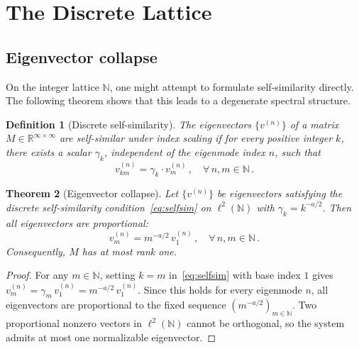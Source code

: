 \documentclass[12pt]{article}
\newtheorem{theorem}{Theorem}
\newtheorem{definition}[theorem]{Definition}
\begin{document}
\section{The Discrete Lattice}\label{sec:discrete}

\subsection{Eigenvector collapse}

On the integer lattice $\mathbb{N}$, one might attempt to formulate self-similarity directly. The following theorem shows that this leads to a degenerate spectral structure.

\begin{definition}[Discrete self-similarity]\label{def:discretess}
The eigenvectors $\{v^{(n)}\}$ of a matrix $M \in \mathbb{R}^{\infty \times \infty}$ are \emph{self-similar under index scaling} if for every positive integer $k$, there exists a scalar $\gamma_k$, independent of the eigenmode index $n$, such that
\begin{equation}\label{eq:selfsim}
v^{(n)}_{km} = \gamma_k \cdot v^{(n)}_m\,, \quad \forall\, n, m \in \mathbb{N}\,.
\end{equation}
\end{definition}

\begin{theorem}[Eigenvector collapse]\label{thm:collapse}
Let $\{v^{(n)}\}$ be eigenvectors satisfying the discrete self-similarity condition~\eqref{eq:selfsim} on $\ell^2(\mathbb{N})$ with $\gamma_k = k^{-a/2}$. Then all eigenvectors are proportional:
\begin{equation}\label{eq:proportional}
v^{(n)}_m = m^{-a/2}\, v^{(n)}_1\,, \quad \forall\, n, m \in \mathbb{N}\,.
\end{equation}
Consequently, $M$ has at most rank one.
\end{theorem}

\begin{proof}
For any $m \in \mathbb{N}$, setting $k = m$ in~\eqref{eq:selfsim} with base index $1$ gives $v^{(n)}_m = \gamma_m\, v^{(n)}_1 = m^{-a/2}\, v^{(n)}_1$. Since this holds for every eigenmode $n$, all eigenvectors are proportional to the fixed sequence $(m^{-a/2})_{m \in \mathbb{N}}$. Two proportional nonzero vectors in $\ell^2(\mathbb{N})$ cannot be orthogonal, so the system admits at most one normalizable eigenvector.
\end{proof}
\end{document}
